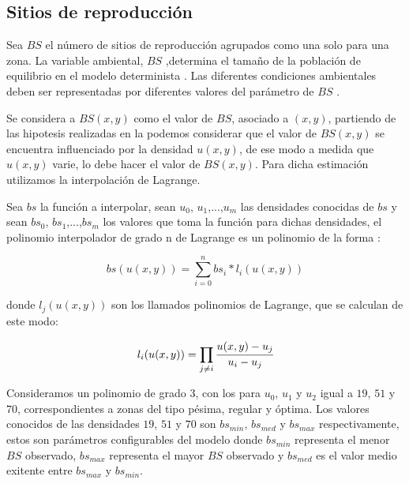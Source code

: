 \subsection{Sitios de reproducción}
\label{subsec:cap4-sitios de reproduccion}
Sea $BS$ el número de sitios de reproducción agrupados como una solo para una zona. La variable
ambiental, $BS$ ,determina el tamaño de la población de equilibrio en el modelo determinista
\citep{otero2006stochastic}. Las diferentes condiciones ambientales deben ser
representadas por diferentes valores del parámetro de $BS$ \citet{otero2006stochastic}.

Se considera a $BS(x,y)$ como el valor de $BS$, asociado a $(x,y)$, partiendo de las hipotesis
realizadas en la  podemos considerar que el valor de $BS(x,y)$ se
encuentra influenciado por la densidad $u(x,y)$, de ese modo a medida que $u(x,y)$ varie, lo debe
hacer el valor de $BS(x,y)$. Para dicha estimación utilizamos la interpolación de Lagrange.

Sea $bs$ la función a interpolar, sean $u_0$, $u_1$,...,$u_m$ las densidades conocidas de $bs$ y
sean $bs_0$, $bs_1$,...,$bs_m$ los valores que toma la función para dichas densidades, el polinomio interpolador de grado n de Lagrange es un polinomio de la forma :

\begin{equation}
\label{eq:sitios-reproduccion-x-y}
    bs(u(x,y)) = \sum_{i=0}^{n} bs_{i} * l_{i}(u(x,y))
\end{equation}

donde $l_j(u(x,y))$ son los llamados polinomios de Lagrange, que se calculan de este modo:

\begin{equation}
\label{eq:sitios-reproduccion-x-y}
    l_{i}(u(x,y)) = \prod_{j \neq i} \cfrac{u(x,y) - u_{j}}{u_{i} - u_{j}}
\end{equation}

Consideramos un polinomio de grado 3, con los para $u_0$, $u_1$ y $u_2$ igual a $19$, $51$ y $70$,
correspondientes a zonas del tipo pésima, regular y óptima. Los valores conocidos de las densidades
$19$, $51$ y $70$ son $bs_{min}$, $bs_{med}$ y $bs_{max}$ respectivamente, estos son parámetros
configurables del modelo donde $bs_{min}$ representa el menor $BS$ observado, $bs_{max}$
representa el mayor $BS$ observado y  $bs_{med}$ es el valor medio exitente entre $bs_{max}$ y
$bs_{min}$.

